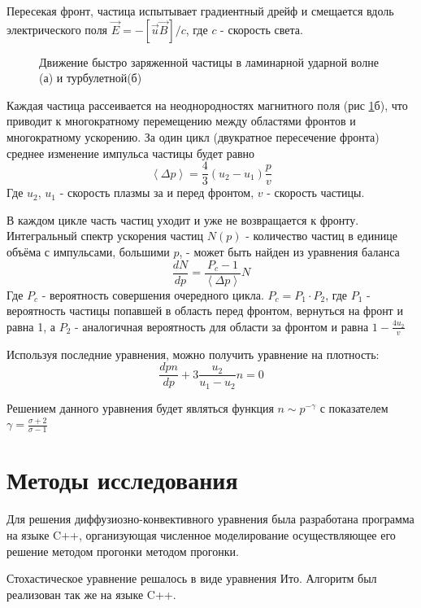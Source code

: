 \documentclass[a4paper,14pt]{extarticle} %
\begin{document}
Пересекая фронт, частица испытывает градиентный дрейф и смещается вдоль электрического поля
$\vec{E} = - [\vec{u}\vec{B}]/c$, где $c$ - скорость света.

\begin{figure}[htbp]
  \centering
  
  \caption{\label{intro/lam} Движение быстро заряженной частицы в ламинарной ударной волне (а) и турбулетной(б)}
\end{figure}
Каждая частица рассеивается на неоднородностях магнитного поля (рис \ref{intro/lam}б), что приводит к многократному перемещению между областями фронтов и многократному ускорению. За один цикл (двукратное пересечение фронта) среднее изменение импульса частицы будет равно
\begin{equation}
\left< \Delta p \right> = \frac{4}{3} (u_2-u_1)\frac{p}{v}
\end{equation}
Где $u_2$, $u_1$ - скорость плазмы за и перед фронтом, $v$ - скорость частицы.

В каждом цикле часть частиц уходит и уже не возвращается к фронту. Интегральный спектр ускорения частиц $N(p)$ - количество частиц в единице объёма с импульсами, большими $p$,  - может быть найден из уравнения баланса
\begin{equation}
\frac{dN}{dp}=\frac{P_c-1}{\left<\Delta p \right>}N
\end{equation}
Где $P_c$ - вероятность совершения очередного цикла. $P_c=P_1 \cdot P_2$, где $P_1$ - вероятность частицы попавшей в область перед фронтом, вернуться на фронт и равна 1, а $P_2$ - аналогичная вероятность для области за фронтом и равна $1-\frac{4u_2}{v}$

Используя последние уравнения, можно получить уравнение на плотность:
\begin{equation}
\frac{d pn}{dp} + 3 \frac{u_2}{u_1-u_2} n = 0
\end{equation}

Решением данного уравнения будет являться функция $n \sim p^{-\gamma}$ с показателем $\gamma=\frac{\sigma+2}{\sigma-1}$

\section{Методы исследования}

Для решения диффузиозно-конвективного уравнения была разработана программа на языке C++, организующая численное моделирование осуществляющее его решение методом прогонки методом прогонки.

Стохастическое уравнение решалось в виде уравнения Ито. Алгоритм был реализован так же на языке C++.
\end{document}
